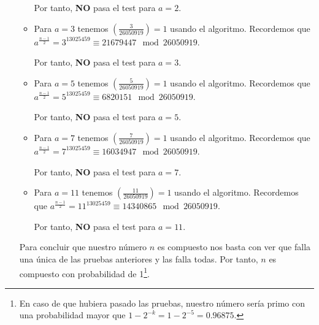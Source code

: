 \begin{enumerate}
\begin{itemize}
			Por tanto, \textbf{NO} pasa el test para $a = 2$.
			
			\item Para $a = 3$ tenemos $\displaystyle \left(\frac{3}{26050919} \right) = 1$ usando el algoritmo.
			Recordemos que $ a^{\frac{n-1}{2}} = 3^{13025459} \equiv 21679447 \mod 26050919$.
			
			Por tanto, \textbf{NO} pasa el test para $a = 3$.
			
			\item Para $a = 5$ tenemos $\displaystyle \left(\frac{5}{26050919} \right) = 1$ usando el algoritmo.
			Recordemos que $ a^{\frac{n-1}{2}} = 5^{13025459} \equiv 6820151 \mod 26050919$.
			
			Por tanto, \textbf{NO} pasa el test para $a = 5$.
			
			\item Para $a = 7$ tenemos $\displaystyle \left(\frac{7}{26050919} \right) = 1$ usando el algoritmo.
			Recordemos que $ a^{\frac{n-1}{2}} = 7^{13025459} \equiv 16034947 \mod 26050919$.
			
			Por tanto, \textbf{NO} pasa el test para $a = 7$.
			
			\item Para $a = 11$ tenemos $\displaystyle \left(\frac{11}{26050919} \right) = 1$ usando el algoritmo.
			Recordemos que $ a^{\frac{n-1}{2}} = 11^{13025459} \equiv 14340865 \mod 26050919$.
			
			Por tanto, \textbf{NO} pasa el test para $a = 11$.		
		\end{itemize}
		
		Para concluir que nuestro número $n$ es compuesto nos basta con ver que falla una única de las pruebas
		anteriores y las falla todas. Por tanto, $n$ es compuesto con probabilidad de 1\footnote{En caso de que
		hubiera pasado las pruebas, nuestro número sería primo con una probabilidad mayor que $1-2^{-k} =
		1-2^{-5} = 0.96875$.}.
		
	\end{enumerate}
